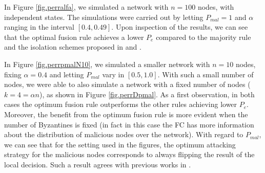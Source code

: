 \documentclass[10pt,peerreview,draftcls,onecolumn]{IEEEtran}
\begin{document}
In Figure \ref{fig.perralfa}, we simulated a network with $n=100$ nodes, with independent states. The simulations were carried out by letting $P_{mal} = 1$ and $\alpha$ ranging in the interval $[0.4, 0.49]$. Upon inspection of the results, we can see that the optimal fusion rule achieves a lower $P_{e}$ compared to the majority rule and the isolation schemes proposed in \cite{Raw11} and \cite{CDC}.

In Figure \ref{fig.perrpmalN10}, we simulated a smaller network with $n=10$ nodes, fixing $\alpha=0.4$ and letting $P_{mal}$ vary in $[0.5,1.0]$. With such a small number of nodes, we were able to also simulate a network with a fixed number of nodes ($k=4 = \alpha n$), as shown in   Figure \ref{fig.perrDpmal}. As a first observation, in both cases the optimum fusion rule outperforms the other rules achieving lower $P_e$. Moreover, the benefit from the optimum fusion rule is more evident when the number of Byzantines is fixed (in fact in this case the FC has more information about the distribution of malicious nodes over the network).
With regard to $P_{mal}$, we can see that for the setting used in the figures, the optimum attacking strategy for the malicious nodes corresponds to always flipping the result of the local decision. Such a result agrees with previous works in \cite{Raw11,CDC}.
\end{document}
